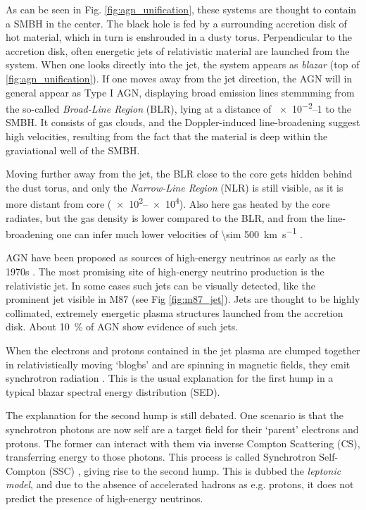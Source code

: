 \documentclass[
    a4paper, %
    fontsize=10pt, %
    twoside=false, %
    numbers=noenddot, %
    fontmethod=tex,
]{kaobook}
\begin{document}
As can be seen in Fig. \ref{fig:agn_unification}, these systems are thought to contain a SMBH in the center. The black hole is fed by a surrounding accretion disk of hot material, which in turn is enshrouded in a dusty torus. Perpendicular to the accretion disk, often energetic jets of relativistic material are launched from the system. When one looks directly into the jet, the system appears as \textit{blazar} (top of \ref{fig:agn_unification}). If one moves away from the jet direction, the AGN will in general appear as Type I AGN, displaying broad emission lines stemmming from the so-called \textit{Broad-Line Region} (BLR), lying at a distance of \SIrange{e-2}{1}{\parsec} to the SMBH. It consists of gas clouds, and the Doppler-induced line-broadening suggest high velocities, resulting from the fact that the material is deep within the graviational well of the SMBH.

Moving further away from the jet, the BLR close to the core gets hidden behind the dust torus, and only the  \textit{Narrow-Line Region} (NLR) is still visible, as it is more distant from core (\SIrange{e2}{e4}{\parsec}). Also here gas heated by the core radiates, but the gas density is lower compared to the BLR, and from the line-broadening one can infer much lower velocities of \SI{\sim 500}{\kilo\m\per\s} .

AGN have been proposed as sources of high-energy neutrinos as early as the 1970s . 
The most promising site of high-energy neutrino production is the relativistic jet. In some cases such jets can be visually detected, like the prominent jet visible in M87 (see Fig \ref{fig:m87_jet}). Jets are thought to be highly collimated, extremely energetic plasma structures launched from the accretion disk. About \SI{10}{\percent} of AGN show evidence of such jets.

When the electrons and protons contained in the jet plasma are clumped together in relativistically moving `blogbs' and are spinning in magnetic fields, they emit synchrotron radiation . This is the usual explanation for the first hump in a typical blazar spectral energy distribution (SED).

The explanation for the second hump is still debated. One scenario is that the synchrotron photons are now self are a target field for their `parent' electrons and protons. The former can interact with them via inverse Compton Scattering (CS), transferring energy to those photons. This process is called Synchrotron Self-Compton (SSC) \cite{Spurio2018}, giving rise to the second hump. This is dubbed the \textit{leptonic model}, and due to the absence of accelerated hadrons as e.g. protons, it does not predict the presence of high-energy neutrinos.
\end{document}
